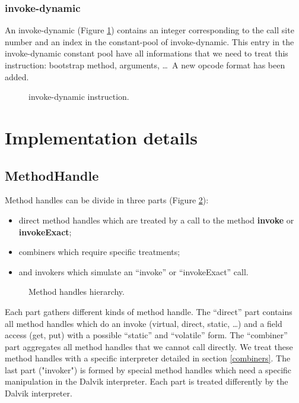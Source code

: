 \documentclass{sig-alternate}
\begin{document}
    \subsubsection{invoke-dynamic}

      An invoke-dynamic (Figure \ref{INDYins}) contains an integer corresponding to the call site number and an index in the constant-pool of invoke-dynamic.
      This entry in the invoke-dynamic constant pool have all informations that we need to treat this instruction: bootstrap method, arguments,
      \dots~A new opcode format has been added.

      \begin{figure}[!h]
        \centering \resizebox{.9\linewidth}{!}{}
        \caption{invoke-dynamic instruction.}\vspace{-1em}
        \label{INDYins}
      \end{figure}

\section{Implementation details}
\label{implD}

    \subsection{MethodHandle}
      Method handles can be divide in three parts (Figure \ref{mhHier}):
      \begin{itemize}
        \item direct method handles which are treated by a call to the method {\bf invoke} or {\bf invokeExact};
        \item combiners which require specific treatments;
        \item and invokers which simulate an ``invoke'' or ``invokeExact'' call.
      \end{itemize}

      \begin{figure}[!h]
        \centering \resizebox{\linewidth}{!}{}
        \caption{Method handles hierarchy.}
        \label{mhHier}
      \end{figure}

      Each part gathers different kinds of method handle.
      The ``direct'' part contains all method handles which do an invoke (virtual, direct, static, \dots)
      and a field access (get, put) with a possible ``static'' and ``volatile'' form.
      The ``combiner'' part aggregates all method handles that we cannot call directly.
      We treat these method handles with a specific interpreter detailed in section \ref{combiners}.
      The last part ("invoker") is formed by special method handles which need a specific manipulation in the Dalvik interpreter.
      Each part is treated differently by the Dalvik interpreter.
\end{document}
